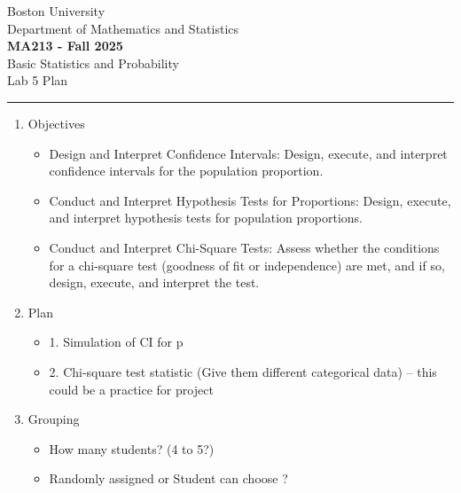 \documentclass[12pt]{article}
\begin{document}
	
	
	
	\begin{center}		
        Boston University \\
        Department of Mathematics and Statistics \\ 
		\Large{\textbf{MA213 - Fall 2025}} \\ 
        \large{Basic Statistics and Probability} \\
        \large{Lab 5 Plan} \\ 
		\noindent\rule{16cm}{2pt}
	\end{center}
	
\begin{enumerate}
    \item Objectives
    \begin{itemize}
        \item Design and Interpret Confidence Intervals: Design, execute, and interpret confidence intervals for the population proportion.
        \item Conduct and Interpret Hypothesis Tests for Proportions: Design, execute, and interpret hypothesis tests for population proportions.
        \item Conduct and Interpret Chi-Square Tests: Assess whether the conditions for a chi-square test (goodness of fit or independence) are met, and if so, design, execute, and interpret the test. 
    \end{itemize}
    \item Plan
    \begin{itemize}
        \item 1. Simulation of CI for p 
        \item 2. Chi-square test statistic (Give them different categorical data) -- this could be a practice for project
    \end{itemize}

    \item  Grouping 
    \begin{itemize}
        \item How many students? (4 to 5?)
        \item Randomly assigned or Student can choose ? 
    \end{itemize}
    


\end{enumerate}
    
\end{document}
